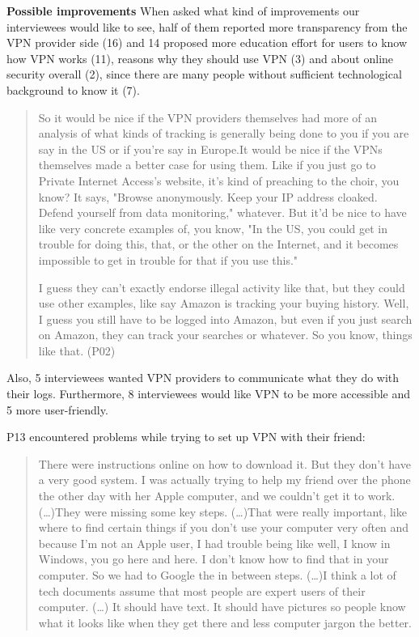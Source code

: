 \textbf{Possible improvements} When asked what kind of improvements our
interviewees would like to see, half of them reported more transparency from
the VPN provider side (16) and 14 proposed more education effort for users to
know how VPN works (11), reasons why they should use VPN (3) and about online
security overall (2), since there are many people without sufficient
technological background to know it (7). 

\begin{quote}So it would be nice if the VPN providers themselves had more of
    an analysis of what kinds of tracking is generally being done to you if
    you are say in the US or if you're say in Europe.It would be nice if the
    VPNs themselves made a better case for using them. Like if you just go to
    Private Internet Access's website, it's kind of preaching to the choir,
    you know? It says, "Browse anonymously. Keep your IP address cloaked.
    Defend yourself from data monitoring," whatever. But it'd be nice to have
    like very concrete examples of, you know, "In the US, you could get in
    trouble for doing this, that, or the other on the Internet, and it becomes
    impossible to get in trouble for that if you use this."

I guess they can't exactly endorse illegal activity like that, but they could
use other examples, like say Amazon is tracking your buying history. Well, I
guess you still have to be logged into Amazon, but even if you just search on
Amazon, they can track your searches or whatever. So you know, things like
that. (P02)\end{quote}


Also, 5 interviewees wanted VPN providers to communicate what they do with
their logs. Furthermore, 8 interviewees would like VPN to be more accessible
and 5 more user-friendly. 

P13 encountered problems while trying to set up VPN with their friend:
\begin{quote}There were instructions online on how to download it. But they
don't have a very good system. I was actually trying to help my friend over
the phone the other day with her Apple computer, and we couldn't get it to
work. (\dots)They were missing some key steps. (\dots)That were really
important, like where to find certain things if you don't use your computer
very often and because I'm not an Apple user, I had trouble being like well, I
know in Windows, you go here and here. I don't know how to find that in your
computer. So we had to Google the in between steps. (\dots)I think a lot of
tech documents assume that most people are expert users of their computer.
(\dots) It should have text. It should have pictures so people know what it
looks like when they get there and less computer jargon the better.\end{quote}

